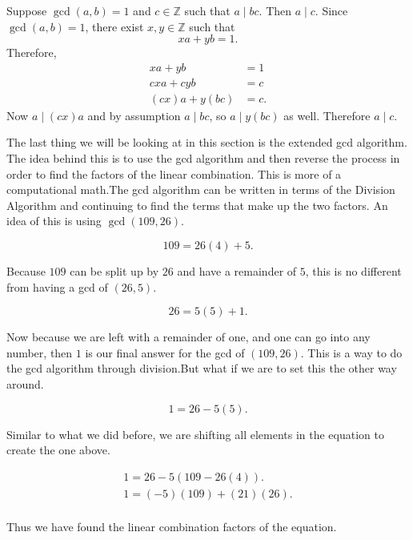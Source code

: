 \begin{theorem}{
    Suppose $\gcd(a,b) = 1$ and $c\in\mathbb{Z}$ such that $a\mid bc$.
    Then $a\mid c$.
}
    Since $\gcd(a,b) = 1$, there exist $x,y\in\mathbb{Z}$ such that
    \[
        xa + yb = 1.
    \]
    Therefore,
    \begin{align*}
        xa + yb &= 1\\
        cxa + cyb &= c\\
        (cx)a + y(bc) &= c.
    \end{align*}
    Now $a\mid (cx)a$ and by assumption $a\mid bc$, so $a\mid y(bc)$ as well.
    Therefore $a\mid c$.
\end{theorem}

The last thing we will be looking at in this section is the extended gcd algorithm.
The idea behind this is to use the gcd algorithm and then reverse the process in order to find the factors of the linear combination.
This is more of a computational math.The gcd algorithm can be written in terms of the Division Algorithm and continuing to find the terms that make up the two factors.
An idea of this is using $\gcd(109,26)$.

\[
    109 = 26(4) + 5.
\]

Because $109$ can be split up by $26$ and have a remainder of $5$, this is no different from having a gcd of $(26,5)$.

\[
    26 = 5(5) + 1.
\]

Now because we are left with a remainder of one, and one can go into any number, then $1$ is our final answer for the gcd of $(109,26)$.
This is a way to do the gcd algorithm through division.But what if we are to set this the other way around.

\[
    1 = 26 - 5(5).
\]

Similar to what we did before, we are shifting all elements in the equation to create the one above.

\begin{gather*}
    1 = 26 - 5(109 - 26(4)).\\
    1 = (-5)(109) + (21)(26).\\
\end{gather*}

Thus we have found the linear combination factors of the equation.
